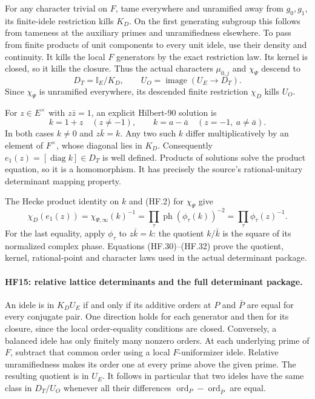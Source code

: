 For any character trivial on $F$, tame everywhere and
unramified away from $g_0,g_1$, its finite-idele
restriction kills $K_D$. On the first generating subgroup
this follows from tameness at the auxiliary primes and
unramifiedness elsewhere. To pass from finite products
of unit components to every unit idele, use their density
and continuity. It kills the local $F$ generators by
the exact restriction law. Its kernel is closed, so
it kills the closure. Thus the actual characters
$\mu_{0,j}$ and $\chi_\Psi$ descend to
\[
              D_T=\mathbb I_E/K_D,\qquad
              U_O=\operatorname{image}(U_E\to D_T).
 \tag{HF.30}
\]
Since $\chi_\Psi$ is unramified everywhere, its descended
finite restriction $\chi_D$ kills $U_O$.

For $z\in E^\times$ with $z\bar z=1$, an explicit
Hilbert-90 solution is
\[
 k=1+z\quad(z\ne-1),\qquad
 k=a-\bar a\quad(z=-1,\ a\ne\bar a).
 \tag{HF.31}
\]
In both cases $k\ne0$ and $z\bar k=k$.
Any two such $k$ differ multiplicatively by an element
of $F^\times$, whose diagonal lies in $K_D$.
Consequently
$e_1(z)=[\operatorname{diag}k]\in D_T$
is well defined. Products of solutions solve the
product equation, so it is a homomorphism. It has
precisely the source's rational-unitary determinant
mapping property.

The Hecke product identity on $k$ and (HF.2) for
$\chi_\Psi$ give
\[
 \chi_D(e_1(z))
   =\chi_{\Psi,\infty}(k)^{-1}
   =\prod_\tau\operatorname{ph}(\phi_\tau(k))^{-2}
   =\prod_\tau\phi_\tau(z)^{-1}.
 \tag{HF.32}
\]
For the last equality, apply $\phi_\tau$ to
$z\bar k=k$: the quotient $k/\bar k$ is the square
of its normalized complex phase. Equations
(HF.30)--(HF.32) prove the quotient, kernel,
rational-point and character laws used in the
actual determinant package.

\paragraph{HF15: relative lattice determinants and the full determinant package.}
An idele is in $K_DU_E$ if and only if its additive
orders at $P$ and $\bar P$ are equal for every conjugate
pair. One direction holds for each generator and then
for its closure, since the local order-equality conditions
are closed. Conversely, a balanced idele has only
finitely many nonzero orders. At each underlying prime
of $F$, subtract that common order using a local
$F$-uniformizer idele. Relative unramifiedness makes
its order one at every prime above the given prime.
The resulting quotient is in $U_E$.
It follows in particular that two ideles have the same
class in $D_T/U_O$ whenever all their differences
$\operatorname{ord}_P-\operatorname{ord}_{\bar P}$
are equal.

